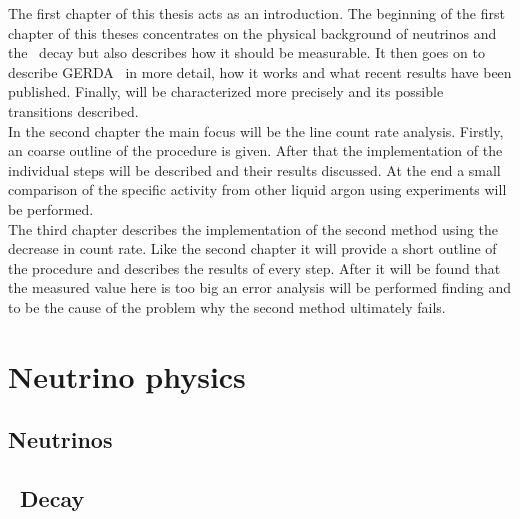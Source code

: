 \documentclass[encoding=utf8,british]{tumphthesis}
\begin{document}
The first chapter of this thesis acts as an introduction.
The beginning of the first chapter of this theses concentrates on the physical background of neutrinos and the \onbb\ decay but also describes how it should be measurable. 
It then goes on to describe GERDA \PII\ in more detail, how it works and what recent results have been published.
Finally, \Kr will be characterized more precisely and its possible transitions described. 
\\

In the second chapter the main focus will be the line count rate analysis.
Firstly, an coarse outline of the procedure is given.
After that the implementation of the individual steps will be described and their results discussed.
At the end a small comparison of the specific activity from other liquid argon using experiments will be performed.
\\

The third chapter describes the implementation of the second method using the decrease in count rate.
Like the second chapter it will provide a short outline of the procedure and describes the results of every step.
After it will be found that the measured value here is too big an error analysis will be performed finding  and  to be the cause of the problem why the second method ultimately fails.
\\


\section{Neutrino physics}
\label{sec:PhyBG}

\subsection{Neutrinos}




\subsection{\onbb\ Decay}
\label{sec:0nubetabeta}
\end{document}
